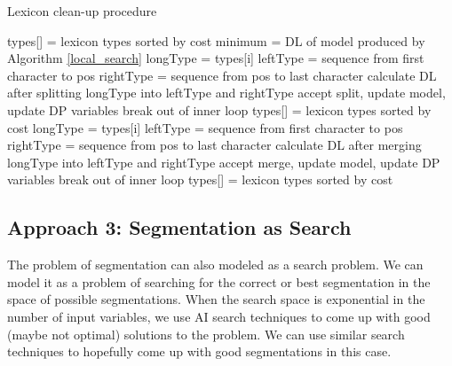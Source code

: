 \documentclass[runningheads]{llncs}
\begin{document}
\begin{algorithm}
	\caption{Lexicon clean-up procedure}
	\label{global_search}
	\begin{algorithmic}[1]
        \State types[] = lexicon types sorted by cost
        \State minimum = DL of model produced by Algorithm \ref{local_search}
        \Repeat
                    \State longType = types[i]
                    \State leftType = sequence from first character to pos
                    \State rightType = sequence from pos to last character
                    \State calculate DL after splitting longType into leftType and rightType
                        \State accept split, update model, update DP variables
                        \State break out of inner loop
                    \EndIf
                \EndFor
            \EndFor
            \State types[] = lexicon types sorted by cost
                    \State longType = types[i]
                    \State leftType = sequence from first character to pos
                    \State rightType = sequence from pos to last character
                    \State calculate DL after merging longType into leftType and rightType
                        \State accept merge, update model, update DP variables
                        \State break out of inner loop
                    \EndIf
                \EndFor
            \EndFor
            \State types[] = lexicon types sorted by cost
	\end{algorithmic}
\end{algorithm}

\subsection{Approach 3: Segmentation as Search}

The problem of segmentation can also modeled as a search problem. We can model it as a problem of searching for the correct or best segmentation in the space of possible segmentations. When the search space is exponential in the number of input variables, we use AI search techniques to come up with good (maybe not optimal) solutions to the problem. We can use similar search techniques to hopefully come up with good segmentations in this case.
\end{document}
